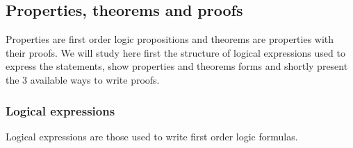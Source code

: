 \subsection{Properties, theorems and proofs}
\label{properties-theorems-proofs}

Properties are first order logic propositions and theorems are
properties with their proofs. We will study here first the structure
of logical expressions used to express the statements, show properties
and theorems forms and shortly present the 3 available ways to write
proofs.



\subsubsection{Logical expressions}
\label{logical-expressions}
Logical expressions are those used to write first order logic
formulas.
\begin{syn}
 \is
     \tok{,} 
\alt {}   
     \tok{,} 
\alt {} \tok{->} 
\alt {} \tok{<->} 
\alt {} \tok{/\backslash} 
\alt {} \tok{\backslash/} 
\alt \tok{\tilde} 
\alt {}
\alt \tok{(}  \tok{)}
\end{syn}

